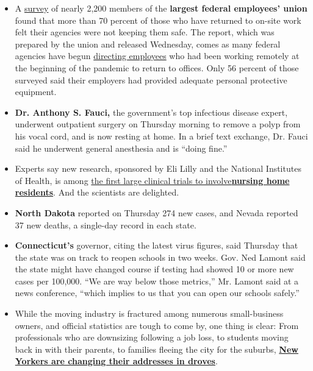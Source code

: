 \begin{itemize}
\item
  A
  \href{https://www.afge.org/publication/federal-workers-feel-unsafe-lack-resources-to-protect-themselves-during-coronavirus-pandemic-afge-survey-shows/}{survey}
  of nearly 2,200 members of the \textbf{largest federal employees'
  union} found that more than 70 percent of those who have returned to
  on-site work felt their agencies were not keeping them safe. The
  report, which was prepared by the union and released Wednesday, comes
  as many federal agencies have begun
  \href{https://www.nytimes3xbfgragh.onion/2020/07/06/us/politics/coronavirus-federal-government.html}{directing
  employees} who had been working remotely at the beginning of the
  pandemic to return to offices. Only 56 percent of those surveyed said
  their employers had provided adequate personal protective equipment.
\item
  \textbf{Dr. Anthony S. Fauci,} the government's top infectious disease
  expert, underwent outpatient surgery on Thursday morning to remove a
  polyp from his vocal cord, and is now resting at home. In a brief text
  exchange, Dr. Fauci said he underwent general anesthesia and is
  ``doing fine.''
\item
  Experts say new research, sponsored by Eli Lilly and the National
  Institutes of Health, is among
  \href{https://www.nytimes3xbfgragh.onion/interactive/2020/us/coronavirus-nursing-homes.html}{the
  first large clinical trials to
  involve}\textbf{\href{https://www.nytimes3xbfgragh.onion/interactive/2020/us/coronavirus-nursing-homes.html}{nursing
  home residents}}. And the scientists are delighted.
\item
  \textbf{North Dakota} reported on Thursday 274 new cases, and Nevada
  reported 37 new deaths, a single-day record in each state.
\item
  \textbf{Connecticut's} governor, citing the latest virus figures, said
  Thursday that the state was on track to reopen schools in two weeks.
  Gov. Ned Lamont said the state might have changed course if testing
  had showed 10 or more new cases per 100,000. ``We are way below those
  metrics,'' Mr. Lamont said at a news conference, ``which implies to us
  that you can open our schools safely.''
\item
  While the moving industry is fractured among numerous small-business
  owners, and official statistics are tough to come by, one thing is
  clear: From professionals who are downsizing following a job loss, to
  students moving back in with their parents, to families fleeing the
  city for the suburbs,
  \textbf{\href{https://www.nytimes3xbfgragh.onion/2020/08/20/nyregion/moving-new-york-coronavirus.html}{New
  Yorkers are changing their addresses in droves}}.
\end{itemize}

